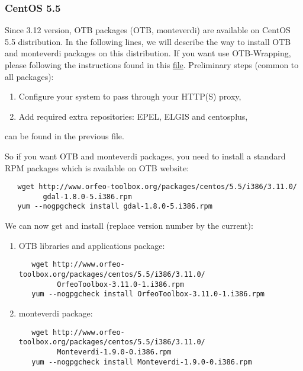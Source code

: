 \subsubsection{CentOS 5.5}
\label{ssec:centos_binaries}
Since 3.12 version, OTB packages (OTB, monteverdi) are available on CentOS 5.5 distribution. In the following lines, we will describe the way to install OTB and monteverdi packages on this distribution. If you want use OTB-Wrapping, please following the instructions found in this \href{http://www.orfeo-toolbox.org/packages/centos/5.5/i386/3.12.0/OTB_packages_on_CentOS_5.5.txt}{file}. Preliminary steps (common to all packages):

\begin{enumerate}

  \item Configure your system to pass through your HTTP(S) proxy,

  \item Add required extra repositories: EPEL, ELGIS and centosplus,

\end{enumerate}
can be found in the previous file.

So if you want OTB and monteverdi packages, you need to install a standard RPM packages which is available on OTB website:
   \begin{verbatim}
   wget http://www.orfeo-toolbox.org/packages/centos/5.5/i386/3.11.0/
         gdal-1.8.0-5.i386.rpm
   yum --nogpgcheck install gdal-1.8.0-5.i386.rpm
   \end{verbatim}
We can now get and install (replace version number by the current):

\begin{enumerate}
\item OTB libraries and applications package:
   \begin{verbatim}
   wget http://www.orfeo-toolbox.org/packages/centos/5.5/i386/3.11.0/
         OrfeoToolbox-3.11.0-1.i386.rpm
   yum --nogpgcheck install OrfeoToolbox-3.11.0-1.i386.rpm
   \end{verbatim}
\item monteverdi package:
   \begin{verbatim}
   wget http://www.orfeo-toolbox.org/packages/centos/5.5/i386/3.11.0/
         Monteverdi-1.9.0-0.i386.rpm
   yum --nogpgcheck install Monteverdi-1.9.0-0.i386.rpm
   \end{verbatim}
\end{enumerate}


